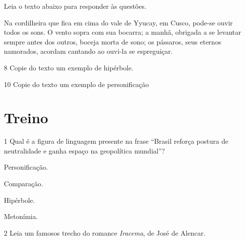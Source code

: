 {%

Leia o texto abaixo para responder às questões.

\begin{myquote}

Na cordilheira que fica em cima do vale de Yyucay, em Cusco,
pode-se ouvir todos os sons. O vento sopra com sua bocarra;
a manhã, obrigada a se levantar sempre antes dos outros,
boceja morta de sono; os pássaros, seus eternos namorados,
acordam cantando ao ouvi-la se espreguiçar.

\end{myquote}


\num{8} Copie do texto um exemplo de hipérbole.


\num{10} Copie do texto um exemplo de personificação


\section{Treino}

\num{1} Qual é a figura de linguagem presente na frase ``Brasil reforça postura de 
neutralidade e ganha espaço na geopolítica mundial''?

\begin{escolha}

  \item Personificação.
  
  \item Comparação.
  
  \item Hipérbole.
  
  \item Metonímia. 

\end{escolha}

\num{2} Leia um famosos trecho do romance \textit{Iracema}, de José de Alencar.

\begin{myquote}


\end{myquote}}
